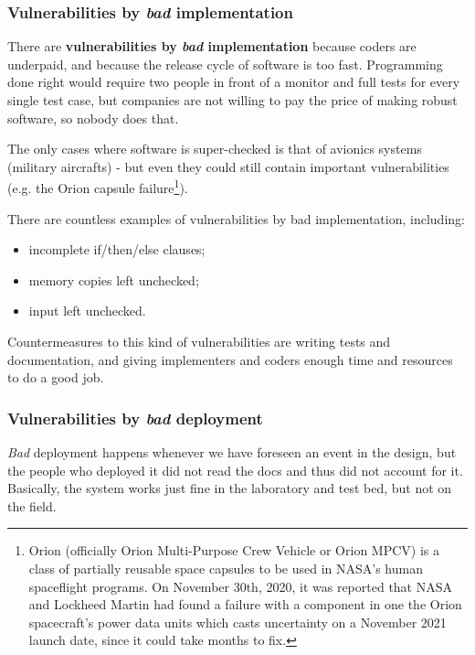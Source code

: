 
\subsubsection*{Vulnerabilities by \textit{bad} implementation}
There are \textbf{vulnerabilities by \textit{bad} implementation} because coders are underpaid, and because the release cycle of software is too fast. Programming done right would require two people in front of a monitor and full tests for every single test case, but companies are not willing to pay the price of making robust software, so nobody does that.

The only cases where software is super-checked is that of avionics systems (military aircrafts) - but even they could still contain important vulnerabilities (e.g. the Orion capsule failure\footnote{Orion (officially Orion Multi-Purpose Crew Vehicle or Orion MPCV) is a class of partially reusable space capsules to be used in NASA's human spaceflight programs. On November 30th, 2020, it was reported that NASA and Lockheed Martin had found a failure with a component in one the Orion spacecraft's power data units which casts uncertainty on a November 2021 launch date, since it could take months to fix.}).

There are countless examples of vulnerabilities by bad implementation, including:

\begin{itemize}
    \item incomplete if/then/else clauses;
    \item memory copies left unchecked;
    \item input left unchecked.
\end{itemize}

Countermeasures to this kind of vulnerabilities are writing tests and documentation, and giving implementers and coders enough time and resources to do a good job.


\subsubsection*{Vulnerabilities by \textit{bad} deployment}
\textit{Bad} deployment happens whenever we have foreseen an event in the design, but the people who deployed it did not read the docs and thus did not account for it. Basically, the system works just fine in the laboratory and test bed, but not on the field.

